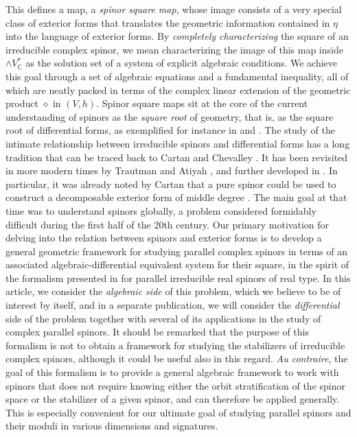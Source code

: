 \documentclass[10pt,a4paper,twoside,reqno]{amsart}
\theoremstyle{plain}
\theoremstyle{definition}
\theoremstyle{remark}
\begin{document}
\noindent
This defines a map, a \emph{spinor square map}, whose image consists of a very special class of exterior forms that translates the geometric information contained in $\eta$ into the language of exterior forms. By \emph{completely characterizing} the square of an irreducible complex spinor, we mean characterizing the image of this map inside $\wedge V^{\ast}_{\mathbb{C}}$ as the solution set of a system of explicit algebraic conditions. We achieve this goal through a set of algebraic equations and a fundamental inequality, all of which are neatly packed in terms of the complex linear extension of the geometric product $\diamond$ in $(V,h)$. Spinor square maps sit at the core of the current understanding of spinors as the \emph{square root} of geometry, that is, as the square root of differential forms, as exemplified for instance in \cite[]{HarveyBook} and \cite[\textsection IV]{Spin89}. The study of the intimate relationship between irreducible spinors and differential forms has a long tradition that can be traced back to Cartan \cite{Cartan1938} and Chevalley \cite{Chev54}. It has been revisited in more modern times by Trautman \cite{Trautman1997} and Atiyah \cite{AtiyahSeminar}, and further developed in \cite{Bhoja:2023dgk,BryantParallel,CharltonThesis,HarveyBook,MeinrenkenBook}. In particular, it was already noted by Cartan that a pure spinor could be used to construct a decomposable exterior form of middle degree \cite{Cartan1938}. The main goal at that time was to understand spinors globally, a problem considered formidably difficult during the first half of the 20th century. Our primary motivation for delving into the relation between spinors and exterior forms is to develop a general geometric framework for studying parallel complex spinors in terms of an associated algebraic-differential equivalent system for their square, in the spirit of the formalism presented in \cite{CLS21,Sha24} for parallel irreducible real spinors of real type. In this article, we consider the \emph{algebraic side} of this problem, which we believe to be of interest by itself, and in a separate publication, we will consider the \emph{differential} side of the problem together with several of its applications in the study of complex parallel spinors. It should be remarked that the purpose of this formalism is not to obtain a framework for studying the stabilizers of irreducible complex spinors, although it could be useful also in this regard. \emph{Au contraire}, the goal of this formalism is to provide a general algebraic framework to work with spinors that does not require knowing either the orbit stratification of the spinor space or the stabilizer of a given spinor, and can therefore be applied generally. This is especially convenient for our ultimate goal of studying parallel spinors and their moduli in various dimensions and signatures.
\end{document}
